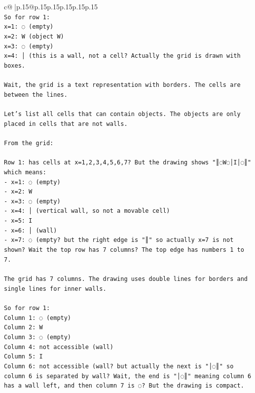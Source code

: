 \documentclass{article}
\begin{document}
{\begin{supertabular}{c@{$\;$}|p{.15\linewidth}@{}p{.15\linewidth}p{.15\linewidth}p{.15\linewidth}p{.15\linewidth}p{.15\linewidth}}
{{{\\ 
\texttt{So for row 1:} \\
\texttt{x=1: ◌ (empty)} \\
\texttt{x=2: W (object W)} \\
\texttt{x=3: ◌ (empty)} \\
\texttt{x=4: │ (this is a wall, not a cell? Actually the grid is drawn with boxes.} \\
\\ 
\texttt{Wait, the grid is a text representation with borders. The cells are between the lines.} \\
\\ 
\texttt{Let's list all cells that can contain objects. The objects are only placed in cells that are not walls.} \\
\\ 
\texttt{From the grid:} \\
\\ 
\texttt{Row 1: has cells at x=1,2,3,4,5,6,7? But the drawing shows "║◌W◌│I│◌║" which means:} \\
\texttt{{-} x=1: ◌ (empty)} \\
\texttt{{-} x=2: W} \\
\texttt{{-} x=3: ◌ (empty)} \\
\texttt{{-} x=4: │ (vertical wall, so not a movable cell)} \\
\texttt{{-} x=5: I} \\
\texttt{{-} x=6: │ (wall)} \\
\texttt{{-} x=7: ◌ (empty? but the right edge is "║" so actually x=7 is not shown? Wait the top row has 7 columns? The top edge has numbers 1 to 7.} \\
\\ 
\texttt{The grid has 7 columns. The drawing uses double lines for borders and single lines for inner walls.} \\
\\ 
\texttt{So for row 1:} \\
\texttt{Column 1: ◌ (empty)} \\
\texttt{Column 2: W} \\
\texttt{Column 3: ◌ (empty)} \\
\texttt{Column 4: not accessible (wall)} \\
\texttt{Column 5: I} \\
\texttt{Column 6: not accessible (wall? but actually the next is "│◌║" so column 6 is separated by wall? Wait, the end is "│◌║" meaning column 6 has a wall left, and then column 7 is ◌? But the drawing is compact.} \\
}}}
\end{supertabular}}
\end{document}
